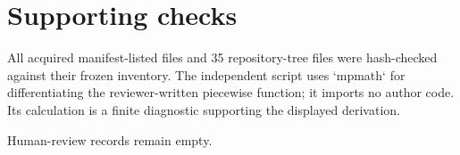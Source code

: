 \documentclass[10pt]{article}
\begin{document}
\section*{Supporting checks}
All acquired manifest-listed files and 35 repository-tree files were hash-checked against their frozen inventory. The independent script uses `mpmath` for differentiating the reviewer-written piecewise function; it imports no author code. Its calculation is a finite diagnostic supporting the displayed derivation.\par
Human-review records remain empty.\par
\end{document}

